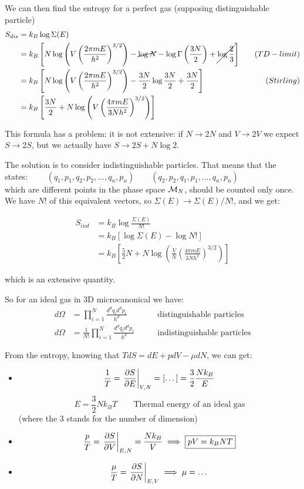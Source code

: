 We can then find the entropy for a perfect gas (supposing distinguishable particle)
\begin{align*}
    S_{dis} &= k_B \log \Sigma(E) \\
    &= k_B\left[N\log\left(V\left(\frac{2\pi mE}{h^2}\right)^{3/2}\right) - \cancel{\log N} - \log \Gamma\left(\frac{3N}2\right) + \cancel{\log\frac23}\right] \quad &(TD-limit)\\
    &= k_B\left[N \log\left(V\left(\frac{2\pi mE}{h^2}\right)^{3/2}\right) - \frac{3N}2 \log\frac{3N}2 + \frac{3N}2\right] \quad &(Stirling) \\
    &= k_B\left[\frac{3N}2 + N\log\left(V\left(\frac{4\pi mE}{3Nh^2}\right)^{3/2}\right)\right]\\
\end{align*}

This formula has a problem: it is not extensive: if $N \to 2N$ and $V \to 2V$ we expect $S \to 2S$, but we actually have $S \to 2S + N\log 2$.

The solution is to consider indistinguishable particles. That means that the states: 
$\qquad  (q_1,p_1, q_2, p_2, \dots, q_n,p_n) \qquad (q_2,p_2, q_1, p_1, \dots, q_n,p_n)  $ \\
which are different points in the phase space $\mathcal{M}_N$, should be counted only once. We have $N!$ of this equivalent vectors, so $\Sigma (E) \to \Sigma(E) / N!$, and we get:

\begin{align} \label{eq:entropy-indistinguishable}
S_{ind} &= k_B\log\frac{\Sigma(E)}{N!} \nonumber \\
&= k_B \left[\log\Sigma(E) - \log N!\right] \nonumber \\
&= k_B \left[\frac52 N + N\log \left(\frac VN \left(\frac{4\pi m E}{3Nh^2}\right)^{3/2}\right)\right] 
\end{align}

which is an extensive quantity.

So for an ideal gas in 3D microcanonical we have:
\begin{align*}
 d\Omega &= \prod_{i=1}^N \frac{d^dq_id^dp_i}{h^d} &\qquad \text{distinguishable particles} \\
 d\Omega &= \frac1{N!}\prod_{i=1}^N \frac{d^dq_id^dp_i}{h^d} &\qquad \text{indistinguishable particles}
\end{align*}

From the entropy, knowing that $TdS = dE + pdV - \mu dN $, we can get:
\begin{itemize}
    \item $$\frac 1T = \left.\frac{\partial S}{\partial E}\right|_{V,N} = [\dots] = \frac 32 \frac{Nk_B}E$$     \begin{equation} \label{eq:thermal-energy}
        \boxed{ E = \frac32 Nk_B T} \qquad \text{Thermal energy of an ideal gas}
    \end{equation}
    (where the 3 stands for the number of dimension)
    \item $$\frac pT = \left.\frac{\partial S}{\partial V}\right|_{E,N} = \frac {Nk_B}V \implies \boxed{pV = k_BNT}$$
    \item $$ \frac \mu T = \left.\frac{\partial S}{\partial N}\right|_{E,V} \implies \mu = \dots$$ 
\end{itemize}

